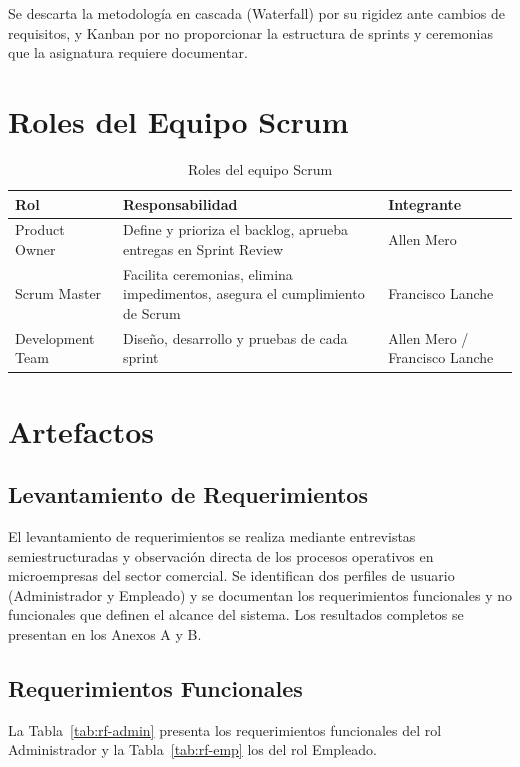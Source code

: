 \documentclass[12pt, letterpaper]{report}
\begin{document}
Se descarta la metodología en cascada (Waterfall) por su rigidez ante cambios de requisitos, y Kanban por no proporcionar la estructura de sprints y ceremonias que la asignatura requiere documentar.

\section{Roles del Equipo Scrum}

\begin{table}[H]
\centering
\caption{Roles del equipo Scrum}
\renewcommand{\arraystretch}{1.3}
\begin{tabularx}{\textwidth}{|l|X|l|}
\hline
\textbf{Rol} & \textbf{Responsabilidad} & \textbf{Integrante} \\ \hline
Product Owner & Define y prioriza el backlog, aprueba entregas en Sprint Review & Allen Mero \\ \hline
Scrum Master & Facilita ceremonias, elimina impedimentos, asegura el cumplimiento de Scrum & Francisco Lanche \\ \hline
Development Team & Diseño, desarrollo y pruebas de cada sprint & Allen Mero / Francisco Lanche \\ \hline
\end{tabularx}
\end{table}

\section{Artefactos}

\subsection{Levantamiento de Requerimientos}

El levantamiento de requerimientos se realiza mediante entrevistas semiestructuradas y observación directa de los procesos operativos en microempresas del sector comercial. Se identifican dos perfiles de usuario (Administrador y Empleado) y se documentan los requerimientos funcionales y no funcionales que definen el alcance del sistema. Los resultados completos se presentan en los Anexos A y B.

\subsection{Requerimientos Funcionales}

La Tabla~\ref{tab:rf-admin} presenta los requerimientos funcionales del rol Administrador y la Tabla~\ref{tab:rf-emp} los del rol Empleado.
\end{document}
